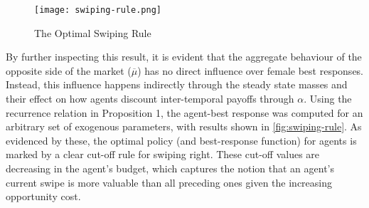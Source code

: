 \begin{figure}[ht]
    \centering
    \caption{The Optimal Swiping Rule}
    \texttt{[image: swiping-rule.png]}
    \label{fig:swiping-rule} 
\end{figure}

By further inspecting this result, it is evident that the aggregate behaviour of the opposite side of the market ($\overline\mu$) has no direct influence over female best responses. Instead, this influence happens indirectly through the steady state masses and their effect on how agents discount inter-temporal payoffs through $\alpha$. Using the recurrence relation in Proposition 1, the agent-best response was computed for an arbitrary set of exogenous parameters, with results shown in \autoref{fig:swiping-rule}. As evidenced by these, the optimal policy (and best-response function) for agents is marked by a clear cut-off rule for swiping right. These cut-off values are decreasing in the agent's budget, which captures the notion that an agent's current swipe is more valuable than all preceding ones given the increasing opportunity cost.  
